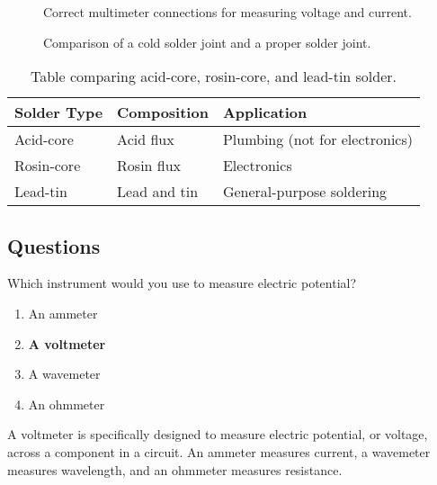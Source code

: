 \begin{figure}[h]
    \centering
    \caption{Correct multimeter connections for measuring voltage and current.}
    \label{fig:multimeter_connections}
\end{figure}

\begin{figure}[h]
    \centering
    \caption{Comparison of a cold solder joint and a proper solder joint.}
    \label{fig:solder_joint_comparison}
\end{figure}

\begin{table}[h]
    \centering
    \begin{tabular}{|l|l|l|}
        \hline
        \textbf{Solder Type} & \textbf{Composition} & \textbf{Application} \\
        \hline
        Acid-core & Acid flux & Plumbing (not for electronics) \\
        Rosin-core & Rosin flux & Electronics \\
        Lead-tin & Lead and tin & General-purpose soldering \\
        \hline
    \end{tabular}
    \caption{Table comparing acid-core, rosin-core, and lead-tin solder.}
    \label{tab:solder_comparison}
\end{table}

\subsection*{Questions}
\begin{tcolorbox}[colback=gray!10!white,colframe=black!75!black,title={T7D01}]
    Which instrument would you use to measure electric potential?
    \begin{enumerate}[label=\Alph*),noitemsep]
        \item An ammeter
        \item \textbf{A voltmeter}
        \item A wavemeter
        \item An ohmmeter
    \end{enumerate}
\end{tcolorbox}
A voltmeter is specifically designed to measure electric potential, or voltage, across a component in a circuit. An ammeter measures current, a wavemeter measures wavelength, and an ohmmeter measures resistance.

